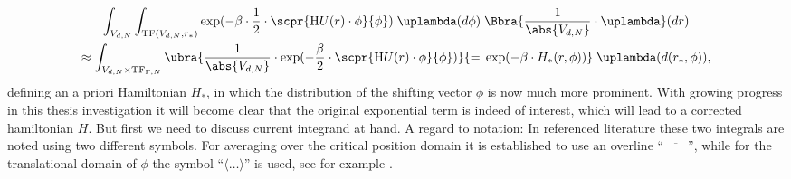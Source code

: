 \begin{multline*}
    \int_{V_{d,N}}\int_{\text{TF}(V_{d,N},r_*)}\exp(-\beta\cdot\frac{1}{2}\cdot\scpr{\text{H}U(r)\cdot\phi}{\phi})\;\uplambda(d\phi)\;\Bbra{\frac{1}{\abs{V_{d,N}}}\cdot\uplambda}(dr) \\
    \approx \int_{V_{d,N}\times\text{TF}_{\Gamma,N}}\ubra{\frac{1}{\abs{V_{d,N}}}\cdot\exp(-\frac{\beta}{2}\cdot\scpr{\text{H}U(r)\cdot\phi}{\phi})}{=\,\exp(-\beta\cdot H_*(r,\phi))}\;\uplambda(d(r_*,\phi)),
\end{multline*}
defining an a priori Hamiltonian $H_*$, in which the distribution of the shifting vector $\phi$ is now much more prominent. With growing progress in this thesis investigation it will become clear that the original exponential term is indeed of interest, which will lead to a corrected hamiltonian $H$. But first we need to discuss current integrand at hand. A regard to notation: In referenced literature these two integrals are noted using two different symbols. For averaging over the critical position domain it is established to use an overline \enquote{\,$\overline{\phantom{aaa}}$\,}, while for the translational domain of $\phi$ the symbol \enquote{$\langle \ldots\rangle$} is used, see for example \cite{paper:Grigera_2011,mth:vogel}. \\

